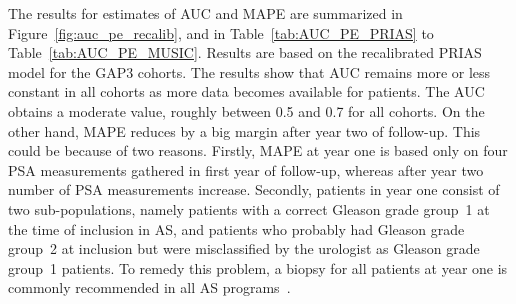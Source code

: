 The results for estimates of AUC and MAPE are summarized in Figure~\ref{fig:auc_pe_recalib}, and in Table~\ref{tab:AUC_PE_PRIAS} to Table~\ref{tab:AUC_PE_MUSIC}. Results are based on the recalibrated PRIAS model for the GAP3 cohorts. The results show that AUC remains more or less constant in all cohorts as more data becomes available for patients. The AUC obtains a moderate value, roughly between 0.5 and 0.7 for all cohorts. On the other hand, MAPE reduces by a big margin after year two of follow-up. This could be because of two reasons. Firstly, MAPE at year one is based only on four PSA measurements gathered in first year of follow-up, whereas after year two number of PSA measurements increase. Secondly, patients in year one consist of two sub-populations, namely patients with a correct Gleason grade group~1 at the time of inclusion in AS, and patients who probably had Gleason grade group~2 at inclusion but were misclassified by the urologist as Gleason grade group~1 patients. To remedy this problem, a biopsy for all patients at year one is commonly recommended in all AS programs~\citep{bokhorst2015compliance}.

